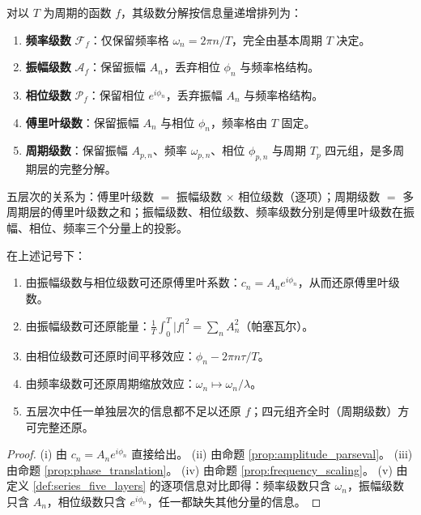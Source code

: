 \begin{definition}[级数谱系的五层次]\label{def:series_five_layers}
对以 $T$ 为周期的函数 $f$，其级数分解按信息量递增排列为：
\begin{enumerate}[label=(\roman*)]
    \item \textbf{频率级数} $\mathcal{F}_f$：仅保留频率格 $\omega_n=2\pi n/T$，完全由基本周期 $T$ 决定。
    \item \textbf{振幅级数} $\mathcal{A}_f$：保留振幅 $A_n$，丢弃相位 $\phi_n$ 与频率格结构。
    \item \textbf{相位级数} $\mathcal{P}_f$：保留相位 $e^{i\phi_n}$，丢弃振幅 $A_n$ 与频率格结构。
    \item \textbf{傅里叶级数}：保留振幅 $A_n$ 与相位 $\phi_n$，频率格由 $T$ 固定。
    \item \textbf{周期级数}：保留振幅 $A_{p,n}$、频率 $\omega_{p,n}$、相位 $\phi_{p,n}$ 与周期 $T_p$ 四元组，是多周期层的完整分解。
\end{enumerate}
五层次的关系为：傅里叶级数 $=$ 振幅级数 $\times$ 相位级数（逐项）；周期级数 $=$ 多周期层的傅里叶级数之和；振幅级数、相位级数、频率级数分别是傅里叶级数在振幅、相位、频率三个分量上的投影。
\end{definition}

\begin{proposition}[五层次的还原关系]\label{prop:series_five_layers_reconstruction}
在上述记号下：
\begin{enumerate}[label=(\roman*)]
    \item 由振幅级数与相位级数可还原傅里叶系数：$c_n=A_n e^{i\phi_n}$，从而还原傅里叶级数。
    \item 由振幅级数可还原能量：$\frac{1}{T}\int_0^T |f|^2=\sum_n A_n^2$（帕塞瓦尔）。
    \item 由相位级数可还原时间平移效应：$\phi_n-2\pi n\tau/T$。
    \item 由频率级数可还原周期缩放效应：$\omega_n\mapsto \omega_n/\lambda$。
    \item 五层次中任一单独层次的信息都不足以还原 $f$；四元组齐全时（周期级数）方可完整还原。
\end{enumerate}
\end{proposition}

\begin{proof}
(i) 由 $c_n=A_n e^{i\phi_n}$ 直接给出。
(ii) 由命题 \ref{prop:amplitude_parseval}。
(iii) 由命题 \ref{prop:phase_translation}。
(iv) 由命题 \ref{prop:frequency_scaling}。
(v) 由定义 \ref{def:series_five_layers} 的逐项信息对比即得：频率级数只含 $\omega_n$，振幅级数只含 $A_n$，相位级数只含 $e^{i\phi_n}$，任一都缺失其他分量的信息。
\end{proof}

